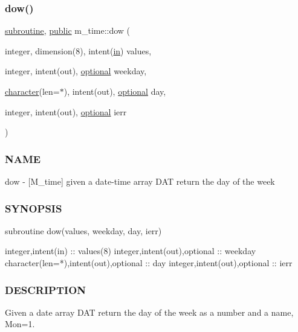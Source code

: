 \subsubsection{\texorpdfstring{dow()}{dow()}}
{\footnotesize\ttfamily \hyperlink{M__stopwatch_83_8txt_acfbcff50169d691ff02d4a123ed70482}{subroutine}, \hyperlink{M__stopwatch_83_8txt_a2f74811300c361e53b430611a7d1769f}{public} m\+\_\+time\+::dow (\begin{DoxyParamCaption}\item[{integer, dimension(8), intent(\hyperlink{M__journal_83_8txt_afce72651d1eed785a2132bee863b2f38}{in})}]{values,  }\item[{integer, intent(out), \hyperlink{option__stopwatch_83_8txt_aa4ece75e7acf58a4843f70fe18c3ade5}{optional}}]{weekday,  }\item[{\hyperlink{option__stopwatch_83_8txt_abd4b21fbbd175834027b5224bfe97e66}{character}(len=$\ast$), intent(out), \hyperlink{option__stopwatch_83_8txt_aa4ece75e7acf58a4843f70fe18c3ade5}{optional}}]{day,  }\item[{integer, intent(out), \hyperlink{option__stopwatch_83_8txt_aa4ece75e7acf58a4843f70fe18c3ade5}{optional}}]{ierr }\end{DoxyParamCaption})}



\subsubsection*{N\+A\+ME}

dow -\/ \mbox{[}M\+\_\+time\mbox{]} given a date-\/time array D\+AT return the day of the week 

\subsubsection*{S\+Y\+N\+O\+P\+S\+IS}

\begin{DoxyVerb}subroutine dow(values, weekday, day, ierr)

 integer,intent(in) :: values(8)
 integer,intent(out),optional :: weekday
 character(len=*),intent(out),optional :: day
 integer,intent(out),optional :: ierr
\end{DoxyVerb}


\subsubsection*{D\+E\+S\+C\+R\+I\+P\+T\+I\+ON}

Given a date array D\+AT return the day of the week as a number and a name, Mon=1.

